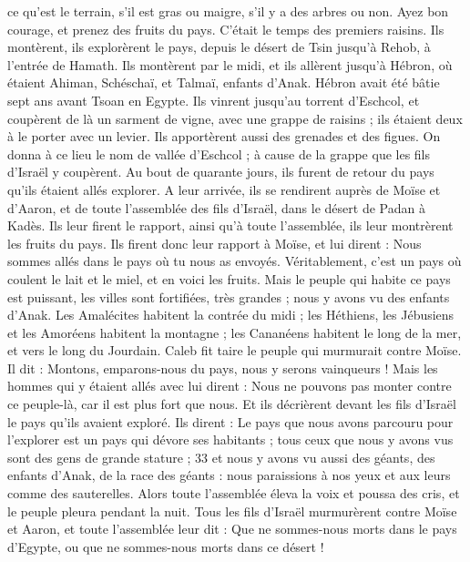 \begin{multicols}{2}
ce qu’est le terrain, s'il est gras ou maigre, s'il y a des arbres ou non. Ayez bon courage, et prenez des fruits du pays. C'était le temps des premiers raisins.
Ils montèrent, ils explorèrent le pays, depuis le désert de Tsin jusqu'à Rehob, à l'entrée de Hamath.
Ils montèrent par le midi, et ils allèrent jusqu'à Hébron, où étaient Ahiman, Schéschaï, et Talmaï, enfants d’Anak. Hébron avait été bâtie sept ans avant Tsoan en Egypte.
Ils vinrent jusqu'au torrent d'Eschcol, et coupèrent de là un sarment de vigne, avec une grappe de raisins ; ils étaient deux à le porter avec un levier. Ils apportèrent aussi des grenades et des figues.
On donna à ce lieu le nom de vallée d’Eschcol ; à cause de la grappe que les fils d'Israël y coupèrent.
Au bout de quarante jours, ils furent de retour du pays qu'ils étaient allés explorer.
A leur arrivée, ils se rendirent auprès de Moïse et d’Aaron, et de toute l'assemblée des fils d'Israël, dans le désert de Padan à Kadès. Ils leur firent le rapport, ainsi qu’à toute l'assemblée, ils leur montrèrent les fruits du pays.
Ils firent donc leur rapport à Moïse, et lui dirent : Nous sommes allés dans le pays où tu nous as envoyés. Véritablement, c'est un pays où coulent le lait et le miel, et en voici les fruits.
Mais le peuple qui habite ce pays est puissant, les villes sont fortifiées, très grandes ; nous y avons vu des enfants d’Anak.
Les Amalécites habitent la contrée du midi ; les Héthiens, les Jébusiens et les Amoréens habitent la montagne ; les Cananéens habitent le long de la mer, et vers le long du Jourdain.
Caleb fit taire le peuple qui murmurait contre Moïse. Il dit : Montons, emparons-nous du pays, nous y serons vainqueurs !
Mais les hommes qui y étaient allés avec lui dirent : Nous ne pouvons pas monter contre ce peuple-là, car il est plus fort que nous.
Et ils décrièrent devant les fils d'Israël le pays qu'ils avaient exploré. Ils dirent : Le pays que nous avons parcouru pour l’explorer est un pays qui dévore ses habitants ; tous ceux que nous y avons vus sont des gens de grande stature ; 33 et nous y avons vu aussi des géants, des enfants d’Anak, de la race des géants : nous paraissions à nos yeux et aux leurs comme des sauterelles.
\VerseOne{}Alors toute l'assemblée éleva la voix et poussa des cris, et le peuple pleura pendant la nuit.
Tous les fils d'Israël murmurèrent contre Moïse et Aaron, et toute l'assemblée leur dit : Que ne sommes-nous morts dans le pays d'Egypte, ou que ne sommes-nous morts dans ce désert !

\end{multicols}
